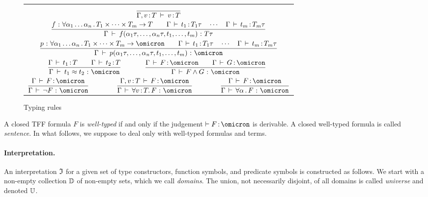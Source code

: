 \begin{figure}
\begin{center}
\begin{tabular}{c@{\qquad\qquad}c}
\multicolumn{2}{c}{$\displaystyle
\frac{}{\Gamma, v \operatorname{:} T \:\vdash\: v \operatorname{:} T}$} \\[4ex]
\multicolumn{2}{c}{$\displaystyle
\frac{f \,\operatorname{:}\, \forall \alpha_1\dots\alpha_n \,.\,
    T_1 \times \dots \times T_m \to T
\qquad
\Gamma \,\vdash\, t_1 \operatorname{:} T_1\tau
\quad\cdots\quad
\Gamma \,\vdash\, t_m \operatorname{:} T_m\tau
}{\Gamma \:\vdash\:
f(\alpha_1\tau,\dots,\alpha_n\tau,t_1,\dots,t_m) \,\operatorname{:}\, T\tau}
$} \\[4ex]
\multicolumn{2}{c}{$\displaystyle
\frac{p \,\ty\, \forall \alpha_1\dots\alpha_n \,.\,
    T_1 \times \dots \times T_m \to \omicron
\qquad
\Gamma \,\vdash\, t_1 \ty T_1\tau
\quad\cdots\quad
\Gamma \,\vdash\, t_m \ty T_m\tau
}{\Gamma \:\vdash\:
p(\alpha_1\tau,\dots,\alpha_n\tau,t_1,\dots,t_m) \,\ty\, \omicron}
$} \\[4ex]
$\qquad\displaystyle
\frac{\Gamma \,\vdash\, t_1 \ty T \qquad \Gamma \,\vdash\, t_2 \ty T}{
\Gamma \:\vdash\: t_1 \approx t_2 \,\ty\, \omicron}$ &
$\displaystyle
\frac{\Gamma \,\vdash\, F \ty \omicron \qquad
\Gamma \,\vdash\, G \ty \omicron}{
\Gamma \,\vdash\, F \land G \,\ty\, \omicron}\qquad$ \\[4ex]
\multicolumn{2}{c}{
$\displaystyle
\frac{\Gamma \,\vdash\, F \ty \omicron}{
\Gamma \,\vdash\, \lnot F \,\ty\, \omicron}\qquad\qquad
\frac{\Gamma, v \ty T \,\vdash\, F \ty \omicron}{
\Gamma \,\vdash\, \forall v \ty T .\, F \,\ty\, \omicron}\qquad\qquad
\frac{\Gamma \,\vdash\, F \ty \omicron}{
\Gamma \,\vdash\, \forall \alpha \,.\, F \,\ty\, \omicron}$}
\end{tabular}
\end{center}
\caption{Typing rules}
\label{fig:typing}
\end{figure}

A closed TFF formula $F$ is {\em well-typed\/} if and only if
the judgement $\vdash F \ty \omicron$ is derivable. A closed
well-typed formula is called {\em sentence}. In what follows,
we suppose to deal only with well-typed formulas and terms.

\paragraph{Interpretation.}
An interpretation $\mathfrak{I}$ for a given set of type constructors,
function symbols, and predicate symbols is constructed as follows.
We start with a non-empty collection $\mathbb{D}$ of non-empty sets,
which we call {\em domains}. The union, not necessarily disjoint,
of all domains is called {\em universe\/} and denoted $\mathbb{U}$.

